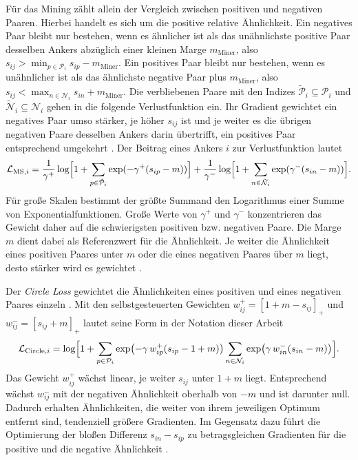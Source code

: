 Für das Mining zählt allein der Vergleich zwischen positiven und negativen Paaren. Hierbei handelt es sich um die positive relative Ähnlichkeit. Ein negatives Paar bleibt nur bestehen, wenn es ähnlicher ist als das unähnlichste positive Paar desselben Ankers abzüglich einer kleinen Marge $m_{\mathrm{Miner}}$, also $s_{ij}>\min_{p\in\mathcal{P}_i}s_{ip}-m_{\mathrm{Miner}}$. Ein positives Paar bleibt nur bestehen, wenn es unähnlicher ist als das ähnlichste negative Paar plus $m_{\mathrm{Miner}}$, also $s_{ij}<\max_{n\in\mathcal{N}_i}s_{in}+m_{\mathrm{Miner}}$. Die verbliebenen Paare mit den Indizes $\tilde{\mathcal{P}}_i\subseteq\mathcal{P}_i$ und $\tilde{\mathcal{N}}_i\subseteq\mathcal{N}_i$ gehen in die folgende Verlustfunktion ein. Ihr Gradient gewichtet ein negatives Paar umso stärker, je höher $s_{ij}$ ist und je weiter es die übrigen negativen Paare desselben Ankers darin übertrifft, ein positives Paar entsprechend umgekehrt \cite{wang_multi-similarity_2019}. Der Beitrag eines Ankers $i$ zur Verlustfunktion lautet \cite{wang_multi-similarity_2019,musgrave_pytorch_2020}
\begin{equation}
  \mathcal{L}_{\mathrm{MS},i}=\frac{1}{\gamma^{+}}\log\Bigl[1+\sum_{p\in\tilde{\mathcal{P}}_i}\exp(-\gamma^{+}(s_{ip}-m))\Bigr]+\frac{1}{\gamma^{-}}\log\Bigl[1+\sum_{n\in\tilde{\mathcal{N}}_i}\exp(\gamma^{-}(s_{in}-m))\Bigr].
  \label{eq:ms}
\end{equation}
Für große Skalen bestimmt der größte Summand den Logarithmus einer Summe von Exponentialfunktionen. Große Werte von $\gamma^{+}$ und $\gamma^{-}$ konzentrieren das Gewicht daher auf die schwierigsten positiven bzw. negativen Paare. Die Marge $m$ dient dabei als Referenzwert für die Ähnlichkeit. Je weiter die Ähnlichkeit eines positiven Paares unter $m$ oder die eines negativen Paares über $m$ liegt, desto stärker wird es gewichtet \cite{wang_multi-similarity_2019}.

Der \emph{Circle Loss} gewichtet die Ähnlichkeiten eines positiven und eines negativen Paares einzeln \cite{sun_circle_2020}. Mit den selbstgesteuerten Gewichten $w^{+}_{ij}=[1+m-s_{ij}]_+$ und $w^{-}_{ij}=[s_{ij}+m]_+$ lautet seine Form in der Notation dieser Arbeit \cite{sun_circle_2020, musgrave_pytorch_2020}
\begin{equation}
  \mathcal{L}_{\mathrm{Circle},i}=\log\Bigl[1+\sum_{p\in\mathcal{P}_i}\exp\bigl(-\gamma\,w^{+}_{ip}(s_{ip}-1+m)\bigr)\sum_{n\in\mathcal{N}_i}\exp\bigl(\gamma\,w^{-}_{in}(s_{in}-m)\bigr)\Bigr].
  \label{eq:circle}
\end{equation}
Das Gewicht $w^{+}_{ij}$ wächst linear, je weiter $s_{ij}$ unter $1+m$ liegt. Entsprechend wächst $w^{-}_{ij}$ mit der negativen Ähnlichkeit oberhalb von $-m$ und ist darunter null. Dadurch erhalten Ähnlichkeiten, die weiter von ihrem jeweiligen Optimum entfernt sind, tendenziell größere Gradienten. Im Gegensatz dazu führt die Optimierung der bloßen Differenz $s_{in}-s_{ip}$ zu betragsgleichen Gradienten für die positive und die negative Ähnlichkeit \cite{sun_circle_2020}.

